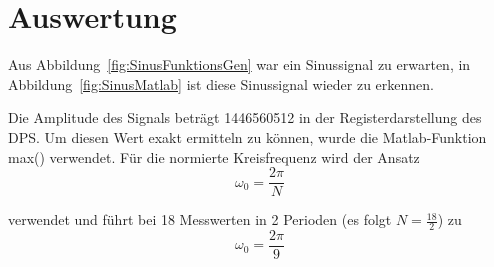 \section{Auswertung}
Aus Abbildung~\ref{fig:SinusFunktionsGen} war ein Sinussignal zu erwarten, in Abbildung~\ref{fig:SinusMatlab} ist diese Sinussignal wieder zu erkennen.\\\par
Die Amplitude des Signals beträgt 1446560512 in der Registerdarstellung des DPS. Um diesen Wert exakt ermitteln zu können, wurde die Matlab-Funktion max() 
verwendet.
Für die normierte Kreisfrequenz wird der Ansatz 
\begin{equation}\label{normierteKreisfrequenz}
 \omega_0=\frac{2\pi}N 
\end{equation}  

verwendet und führt bei 18 Messwerten in 2 Perioden (es folgt \begin{math}N=\frac{18}{2}\end{math}) zu 
\begin{equation*}
 \omega_0=\frac{2\pi}9 
\end{equation*}

